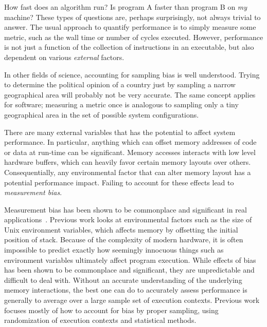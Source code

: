 \documentclass[a4paper,10pt,twocolumn,twoside]{article}
\begin{document}
How fast does an algorithm run?
Is program A faster than program B on \emph{my} machine?
These types of questions are, perhaps surprisingly, not always trivial to answer.
The usual approach to quantify performance is to simply measure some metric, such as the wall time or number of cycles executed.
However, performance is not just a function of the collection of instructions in an executable, but also dependent on various \emph{external} factors.

In other fields of science, accounting for sampling bias is well understood.
Trying to determine the political opinion of a country just by sampling a narrow geographical area will probably not be very accurate.
The same concept applies for software; measuring a metric once is analogous to sampling only a tiny geographical area in the set of possible system configurations.

There are many external variables that has the potential to affect system performance.
In particular, anything which can offset memory addresses of code or data at run-time can be significant.
Memory accesses interacts with low level hardware buffers, which can heavily favor certain memory layouts over others.
Consequentially, any environmental factor that can alter memory layout has a potential performance impact.
Failing to account for these effects lead to \emph{measurement bias}. 

Measurement bias has been shown to be commonplace and significant in real applications~\cite{Mytkowicz:2008:OE&MB, Mytkowicz:2009:WrongData, Mytkowicz:2008:Easy}.
Previous work looks at environmental factors such as the size of Unix environment variables, which affects memory by offsetting the initial position of stack.
Because of the complexity of modern hardware, it is often impossible to predict exactly how seemingly innocuous things such as environment variables ultimately affect program execution.
While effects of bias has been shown to be commonplace and significant, they are unpredictable and difficult to deal with.
Without an accurate understanding of the underlying memory interactions, the best one can do to accurately assess performance is generally to average over a large sample set of execution contexts.
Previous work focuses mostly of how to account for bias by proper sampling, using randomization of execution contexts and statistical methods. %
\end{document}
